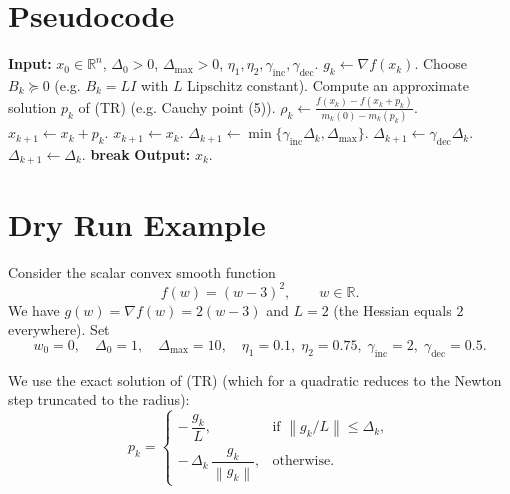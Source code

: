 \documentclass[11pt]{article}
\newcommand{\norm}[1]{\left\lVert #1\right\rVert}
\newcommand{\R}{\mathbb{R}}
\begin{document}
\section*{Pseudocode}
\begin{algorithm}[H]
\caption{Trust‑Region Gradient Method (TR‑GM)}
\begin{algorithmic}[1]
\STATE \textbf{Input:} $x_{0}\in\R^{n}$, $\Delta_{0}>0$, $\Delta_{\max}>0$,
$\eta_{1},\eta_{2},\gamma_{\text{inc}},\gamma_{\text{dec}}$.
    \STATE $g_{k}\gets\nabla f(x_{k})$.
    \STATE Choose $B_{k}\succeq0$ (e.g. $B_{k}=L I$ with $L$ Lipschitz constant).
    \STATE Compute an approximate solution $p_{k}$ of (TR) 
            (e.g. Cauchy point (5)).
    \STATE $\rho_{k}\gets\displaystyle\frac{f(x_{k})-f(x_{k}+p_{k})}
                                   {m_{k}(0)-m_{k}(p_{k})}$.
        \STATE $x_{k+1}\gets x_{k}+p_{k}$.
    \ELSE
        \STATE $x_{k+1}\gets x_{k}$.
    \ENDIF
        \STATE $\Delta_{k+1}\gets\min\{\gamma_{\text{inc}}\Delta_{k},\Delta_{\max}\}$.
        \STATE $\Delta_{k+1}\gets\gamma_{\text{dec}}\Delta_{k}$.
    \ELSE
        \STATE $\Delta_{k+1}\gets\Delta_{k}$.
    \ENDIF
        \STATE \textbf{break}
    \ENDIF
\ENDFOR
\STATE \textbf{Output:} $x_{k}$.
\end{algorithmic}
\end{algorithm}

\section*{Dry Run Example}
Consider the scalar convex smooth function
\[
f(w)=(w-3)^{2},\qquad w\in\R .
\]
We have $g(w)=\nabla f(w)=2(w-3)$ and $L=2$ (the Hessian equals $2$ everywhere).
Set
\[
w_{0}=0,\quad \Delta_{0}=1,\quad \Delta_{\max}=10,\quad 
\eta_{1}=0.1,\;\eta_{2}=0.75,\;
\gamma_{\text{inc}}=2,\;\gamma_{\text{dec}}=0.5 .
\]

We use the exact solution of (TR) (which for a quadratic reduces to the
Newton step truncated to the radius):
\[
p_{k}= 
\begin{cases}
-\,\dfrac{g_{k}}{L}, & \text{if }\norm{g_{k}/L}\le\Delta_{k},\\[6pt]
-\,\Delta_{k}\,\dfrac{g_{k}}{\norm{g_{k}}}, & \text{otherwise}.
\end{cases}
\tag{6}
\]
\end{document}
